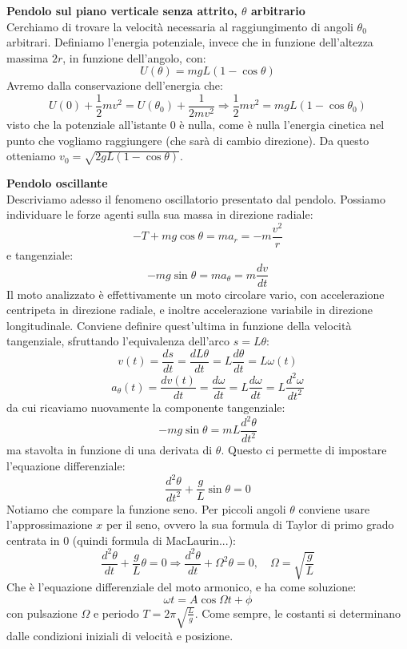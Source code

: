 \documentclass[a4paper,12pt]{article}
\begin{document}
\textbf{Pendolo sul piano verticale senza attrito, $\theta$ arbitrario} \\
Cerchiamo di trovare la velocità necessaria al raggiungimento di angoli $\theta_0$ arbitrari. Definiamo l'energia potenziale,
invece che in funzione dell'altezza massima $2r$, in funzione dell'angolo, con:
$$ U(\theta) = mgL(1-\cos{\theta}) $$
Avremo dalla conservazione dell'energia che:
$$ U(0) + \frac{1}{2}mv^2 = U(\theta_0) + \frac{1}{2mv^2} \Rightarrow \frac{1}{2}mv^2 = mgL(1-\cos{\theta_0})$$
visto che la potenziale all'istante 0 è nulla, come è nulla l'energia cinetica nel punto che vogliamo raggiungere
(che sarà di cambio direzione). Da questo otteniamo $v_0 = \sqrt{2gL(1-\cos{\theta})}$.
\par\smallskip
\textbf{Pendolo oscillante} \\
Descriviamo adesso il fenomeno oscillatorio presentato dal pendolo. Possiamo individuare le forze agenti sulla sua massa in direzione
radiale:
$$ -T + mg\cos{\theta} = ma_r = -m \frac{v^2}{r} $$
e tangenziale:
$$ -mg\sin{\theta} = ma_\theta = m \frac{dv}{dt} $$
Il moto analizzato è effettivamente un moto circolare vario, con accelerazione centripeta in direzione radiale, e inoltre
accelerazione variabile in direzione longitudinale. Conviene definire quest'ultima in funzione della velocità tangenziale,
sfruttando l'equivalenza dell'arco $s = L\theta$:
$$ v(t) = \frac{ds}{dt} = \frac{dL\theta}{dt} = L \frac{d\theta}{dt} = L\omega(t) $$
$$ a_\theta(t) = \frac{dv(t)}{dt} = \frac{d\omega}{dt} = L\frac{d\omega}{dt} = L\frac{d^2\omega}{dt^2} $$
da cui ricaviamo nuovamente la componente tangenziale:
$$ -mg\sin{\theta} = mL \frac{d^2 \theta}{dt^2} $$
ma stavolta in funzione di una derivata di $\theta$. Questo ci permette di impostare l'equazione differenziale:
$$ \frac{d^2\theta}{dt^2} + \frac{g}{L}\sin{\theta} = 0$$
Notiamo che compare la funzione seno. Per piccoli angoli $\theta$ conviene usare l'approssimazione $x$ per il seno,
ovvero la sua formula di Taylor di primo grado centrata in 0 (quindi formula di MacLaurin...):
$$ \frac{d^2\theta}{dt} + \frac{g}{L}\theta = 0 \Rightarrow \frac{d^2\theta}{dt} + \Omega^2\theta = 0, \quad \Omega = \sqrt{\frac{g}{L}} $$
Che è l'equazione differenziale del moto armonico, e ha come soluzione:
$$ \omega{t} = A\cos{\Omega t + \phi} $$
con pulsazione $\Omega$ e periodo $T = 2\pi\sqrt{\frac{L}{g}}$. Come sempre, le costanti si determinano dalle condizioni iniziali di velocità
e posizione.
\end{document}
